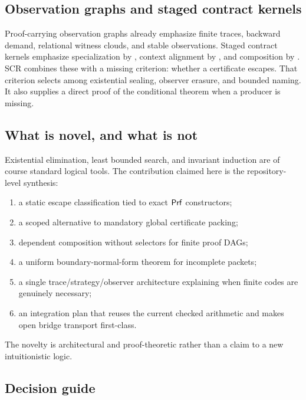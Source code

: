 \subsection{Observation graphs and staged contract kernels}

Proof-carrying observation graphs already emphasize finite traces, backward
demand, relational witness clouds, and stable observations.  Staged contract
kernels emphasize specialization by , context alignment by
, and composition by .  SCR combines these
with a missing criterion: whether a certificate escapes.  That criterion
selects among existential sealing, observer erasure, and bounded naming.  It
also supplies a direct proof of the conditional theorem when a producer is
missing.

\subsection{What is novel, and what is not}

Existential elimination, least bounded search, and invariant induction are of
course standard logical tools.  The contribution claimed here is the
repository-level synthesis:
\begin{enumerate}[label=(\roman*)]
\item a static escape classification tied to exact \(\mathsf{Prf}\) constructors;
\item a scoped alternative to mandatory global certificate packing;
\item dependent composition without selectors for finite proof DAGs;
\item a uniform boundary-normal-form theorem for incomplete packets;
\item a single trace/strategy/observer architecture explaining when finite
      codes are genuinely necessary;
\item an integration plan that reuses the current checked arithmetic and makes
      open bridge transport first-class.
\end{enumerate}
The novelty is architectural and proof-theoretic rather than a claim to a new
intuitionistic logic.

\subsection{Decision guide}

